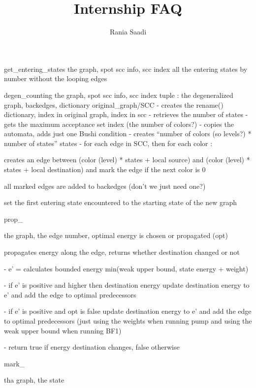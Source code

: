 \documentclass[runningheads, envcountsame]{llncs}
\begin{document}
\title{Internship FAQ}
\author{Rania Saadi}

\maketitle

get_entering_states
the graph, spot scc info, scc index
all the entering states by number without the looping edges

degen_counting
the graph, spot scc info, scc index
tuple : the degeneralized graph, backedges, dictionary original_graph/SCC
- creates the rename() dictionary, index in original graph, index in scc
- retrieves the number of states
- gets the maximum acceptance set index (the number of colors?)
- copies the automata, adds just one Bushi condition
- creates “number of colors (so levels?) * number of states” states
- for each edge in SCC, then for each color :

    creates an edge between (color (level) * states + local source) and (color (level) * states + local destination) and mark the edge if the next color is 0

    all marked edges are added to backedges (don’t we just need one?)

    set the first entering state encountered to the starting state of the new graph



prop_

the graph, the edge number, optimal energy is chosen or propagated (opt)

propagates energy along the edge, returns whether destination changed or not

- e’ = calculates bounded energy min(weak upper bound, state energy + weight)

- if e’ is positive and higher then destination energy update destination energy to e’ and add the edge to optimal predecessors

- if e’ is positive and opt is false update destination energy to e’ and add the edge to optimal predecessors (just using the weights when running pump and using the weak upper bound when running BF1)

- return true if energy destination changes, false otherwise



mark_

tha graph, the state
\end{document}
